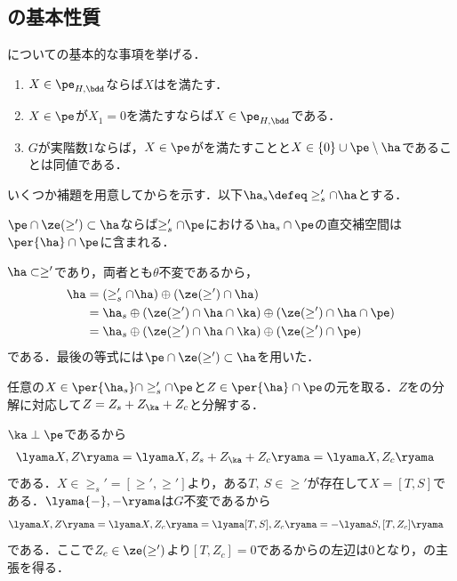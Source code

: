 \subsection{の基本性質}
についての基本的な事項を挙げる．

\begin{lem}\label{lem:basic-prob}
  \leavevmode\vspace{-1em}
  \begin{enumerate}[label=\textbf{\arabic*.}]
  \item $X\in \pe_{H,\bdd} $ならば$X$はを満たす．
  \item $X \in \pe $が$X_1 = 0$を満たすならば$X\in \pe_{H,\bdd} $である．
  \item $G$が実階数1ならば，$X\in\pe$がを満たすことと$X\in \{0\}\cup \pe\setminus\ha $であることは同値である．
  \end{enumerate}
\end{lem}

いくつか補題を用意してからを示す．以下$\ha_s\defeq \ge_{s}'\cap\ha $とする．
\begin{lem}\label{lem:0117-perp}
  $\pe\cap \ze(\ge')\subset \ha $ならば$\ge'_s\cap\pe $における$\ha_s\cap \pe$の直交補空間は$\per{\ha}\cap\pe $に含まれる．
\end{lem}
\begin{npfwn}
  $\ha\subset \ge' $であり，両者とも$\theta$不変であるから，
  \begin{align}
    \ha &= (\ge'_s\cap \ha)\oplus (\ze(\ge')\cap\ha )\notag \\
        &= \ha_s\oplus (\ze(\ge')\cap\ha\cap\ka )\oplus (\ze(\ge')\cap\ha\cap\pe ) \notag\\
        &= \ha_s\oplus (\ze(\ge')\cap\ha\cap\ka )\oplus (\ze(\ge')\cap\pe ) \label{eq:0117-perp}
  \end{align}
  である．最後の等式には$\pe\cap \ze(\ge')\subset \ha $を用いた．

  任意の$X\in \per{\ha_s}\cap \ge'_s\cap\pe $と$Z\in \per{\ha}\cap\pe $の元を取る．$Z$をの分解に対応して$Z = Z_s + Z_{\ka} + Z_{c} $と分解する．
  
  $\ka\perp\pe $であるから
  \begin{align*}
    \lyama X, Z\ryama &= \lyama X, Z_s + Z_{\ka} + Z_{c}\ryama = \lyama X,   Z_{c}\ryama
  \end{align*}
  である．$X\in \ge_{s}' = [\ge', \ge'] $より，ある$T,\ S\in \ge'$が存在して$X = [T, S] $である．$\lyama {-}, {-}\ryama $は$G$不変であるから
  \begin{align}
    \lyama X, Z\ryama &= \lyama X,   Z_{c}\ryama = \lyama [T, S],   Z_{c}\ryama = -\lyama S,   [T, Z_{c}]\ryama\label{eq:0117-perp-2}
  \end{align}
  である．ここで$Z_c\in \ze(\ge') $より$[T, Z_c ]= 0$であるからの左辺は0となり，の主張を得る．
\end{npfwn}

